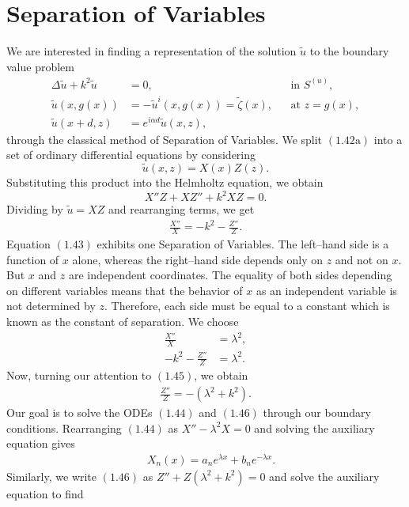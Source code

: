 \section{Separation of Variables}
\label{intro:sov}
We are interested in finding a representation of the solution $\tilde{u}$ to the boundary value problem
\begin{subequations}
\begin{align}
\Delta \tilde{u} + k^2 \tilde{u} &=0,&& \text{in $S^{(u)}$},\\
\tilde{u}(x,g(x))&=-\tilde{u}^{i}(x,g(x))=\tilde{\zeta}(x),&& \text{at $z=g(x)$},\\
\tilde{u}(x+d,z)&=e^{i\alpha d}\tilde{u}(x,z),
\end{align}
\end{subequations}
through the classical method of Separation of Variables. We split $(1.42\text{a})$ into a set of ordinary differential equations by considering 
$$\tilde{u}(x,z)=X(x)Z(z).$$
Substituting this product into the Helmholtz equation, we obtain 
$$X''Z + XZ'' + k^2XZ=0.$$
Dividing by $\tilde{u} = XZ$ and rearranging terms, we get 
\begin{align}
\frac{X''}{X}= -k^2 - \frac{Z''}{Z}.
\end{align}
Equation $(1.43)$ exhibits one Separation of Variables. The left--hand side is a function of $x$ alone, whereas the right--hand side depends only on $z$ and not on $x$. But $x$ and $z$ are independent coordinates. The equality of both sides depending on different variables means that the behavior of $x$ as an independent variable is not determined by $z$. Therefore, each side must be equal to a constant which is known as the constant of separation. We choose 
\begin{align}
  \frac{X''}{X}&=\lambda^2, \\ 
  -k^2 - \frac{Z''}{Z}&=\lambda^2.
\end{align}
Now, turning our attention to $(1.45)$, we obtain 
\begin{align}
 \frac{Z''}{Z} = -\left(\lambda^2 +k^2\right).  
\end{align}
Our goal is to solve the ODEs $(1.44)$ and $(1.46)$ through our boundary conditions. Rearranging $(1.44)$ as $X''-\lambda^2 X=0$ and solving the auxiliary equation gives
\begin{align}
\quad X_n(x)=a_ne^{\lambda x} + b_ne^{-\lambda x}.
\end{align}
Similarly, we write $(1.46)$ as $Z'' + Z\left(\lambda^2+k^2\right)=0$ and solve the auxiliary equation to find
